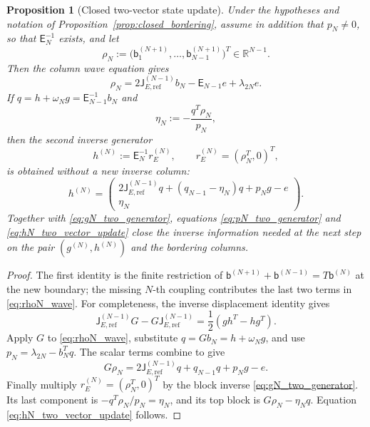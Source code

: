 \documentclass[preprint,12pt]{elsarticle}
\numberwithin{equation}{section}
\theoremstyle{plain}
\newtheorem{proposition}[theorem]{Proposition}
\theoremstyle{definition}
\theoremstyle{remark}
\newcommand{\E}{\mathsf E}
\newcommand{\J}{\mathsf J}
\begin{document}
\begin{proposition}[Closed two-vector state update]
\label{prop:two_vector_state_update}
Under the hypotheses and notation of Proposition~\ref{prop:closed_bordering}, assume in addition
that \(p_N\ne0\), so that \(\E_N^{-1}\) exists, and let
\begin{equation}
 \rho_N:=\bigl(\mathsf b^{(N+1)}_1,\dots,\mathsf b^{(N+1)}_{N-1}\bigr)^T\in\mathbb R^{N-1}.
 \label{eq:rhoN_two_vector}
\end{equation}
Then the column wave equation gives
\begin{equation}
 \boxed{\;
 \rho_N=2\J_{E,\mathrm{ref}}^{(N-1)}b_N-\E_{N-1}e+\lambda_{2N}e.\;}
 \label{eq:rhoN_wave}
\end{equation}
If $q=h+\omega_Ng=\E_{N-1}^{-1}b_N$ and
\begin{equation}
 \eta_N:=-\frac{q^T\rho_N}{p_N},
 \label{eq:etaN_two_vector}
\end{equation}
then the second inverse generator
\begin{equation}
 h^{(N)}:=\E_N^{-1}r_E^{(N)},
 \qquad
 r_E^{(N)}=(\rho_N^T,0)^T,
\end{equation}
is obtained without a new inverse column:
\begin{equation}
 \boxed{
 h^{(N)}=
 \begin{pmatrix}
 2\J_{E,\mathrm{ref}}^{(N-1)}q+(q_{N-1}-\eta_N)q+p_Ng-e\\[2pt]
 \eta_N
 \end{pmatrix}.}
 \label{eq:hN_two_vector_update}
\end{equation}
Together with \eqref{eq:gN_two_generator}, equations
\eqref{eq:pN_two_generator} and \eqref{eq:hN_two_vector_update} close the inverse information
needed at the next step on the pair $(g^{(N)},h^{(N)})$ and the bordering columns.
\end{proposition}

\begin{proof}
The first identity is the finite restriction of
$\mathsf b^{(N+1)}+\mathsf b^{(N-1)}=T\mathsf b^{(N)}$ at the new boundary; the missing
$N$-th coupling contributes the last two terms in \eqref{eq:rhoN_wave}.  For completeness,
the inverse displacement identity gives
\begin{equation}
 \J_{E,\mathrm{ref}}^{(N-1)}G-G\J_{E,\mathrm{ref}}^{(N-1)}
 =\frac12(gh^T-hg^T).
 \label{eq:inverse_displacement_gh_local}
\end{equation}
Apply $G$ to \eqref{eq:rhoN_wave}, substitute $q=Gb_N=h+\omega_Ng$, and use
$p_N=\lambda_{2N}-b_N^Tq$.  The scalar terms combine to give
\begin{equation}
 G\rho_N=2\J_{E,\mathrm{ref}}^{(N-1)}q+q_{N-1}q+p_Ng-e.
 \label{eq:Grho_two_vector}
\end{equation}
Finally multiply $r_E^{(N)}=(\rho_N^T,0)^T$ by the block inverse
\eqref{eq:gN_two_generator}.  Its last component is $-q^T\rho_N/p_N=\eta_N$, and its top
block is $G\rho_N-\eta_Nq$.  Equation \eqref{eq:hN_two_vector_update} follows.
\end{proof}
\end{document}
